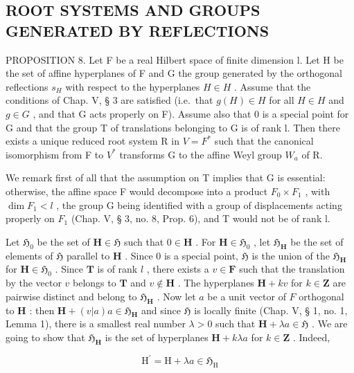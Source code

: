 \subsection{ROOT SYSTEMS AND GROUPS GENERATED BY REFLECTIONS}

PROPOSITION 8. Let F be a real Hilbert space of finite dimension l. Let H be the set of affine hyperplanes of F and G the group generated by the orthogonal reflections \(s_{H}\) with respect to the hyperplanes \(H \in H\) . Assume that the conditions of Chap. V, § 3 are satisfied (i.e.~that \(g(H) \in H\) for all \(H \in H\) and \(g \in G\) , and that G acts properly on F). Assume also that 0 is a special point for G and that the group T of translations belonging to G is of rank l. Then there exists a unique reduced root system R in \(V = F^{*}\) such that the canonical isomorphism from F to \(V^{*}\) transforms G to the affine Weyl group \(W_{a}\) of R.

We remark first of all that the assumption on T implies that G is essential: otherwise, the affine space F would decompose into a product \(F_{0} \times F_{1}\) , with \(\dim F_{1} < l\) , the group G being identified with a group of displacements acting properly on \(F_{1}\) (Chap. V, § 3, no. 8, Prop. 6), and T would not be of rank l.

Let \(\mathfrak{H}_0\) be the set of \(\mathbf{H} \in \mathfrak{H}\) such that \(0 \in \mathbf{H}\) . For \(\mathbf{H} \in \mathfrak{H}_0\) , let \(\mathfrak{H}_{\mathbf{H}}\) be the set of elements of \(\mathfrak{H}\) parallel to \(\mathbf{H}\) . Since 0 is a special point, \(\mathfrak{H}\) is the union of the \(\mathfrak{H}_{\mathbf{H}}\) for \(\mathbf{H} \in \mathfrak{H}_0\) . Since \(\mathbf{T}\) is of rank \(l\) , there exists a \(v \in \mathbf{F}\) such that the translation by the vector \(v\) belongs to \(\mathbf{T}\) and \(v \notin \mathbf{H}\) . The hyperplanes \(\mathbf{H} + kv\) for \(k \in \mathbf{Z}\) are pairwise distinct and belong to \(\mathfrak{H}_{\mathbf{H}}\) . Now let \(a\) be a unit vector of \(F\) orthogonal to \(\mathbf{H}\) : then \(\mathbf{H} + (v|a)a \in \mathfrak{H}_{\mathbf{H}}\) and since \(\mathfrak{H}\) is locally finite (Chap. V, § 1, no. 1, Lemma 1), there is a smallest real number \(\lambda > 0\) such that \(\mathbf{H} + \lambda a \in \mathfrak{H}\) . We are going to show that \(\mathfrak{H}_{\mathbf{H}}\) is the set of hyperplanes \(\mathbf{H} + k\lambda a\) for \(k \in \mathbf{Z}\) . Indeed,

\[
\mathrm{H} ^ {\prime} = \mathrm{H} + \lambda a \in \mathfrak {H} _ {\mathrm{H}}
\]

